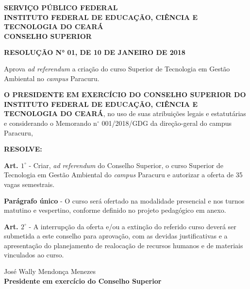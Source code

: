 
\begin{center}
\begin{figure}[!ht]
\centering
\end{figure}
\vspace*{-0.8cm}
\textbf{
SERVIÇO PÚBLICO FEDERAL \\
INSTITUTO FEDERAL DE EDUCAÇÃO, CIÊNCIA E TECNOLOGIA DO CEARÁ \\
CONSELHO SUPERIOR
}
\end{center}

\begin{center}
\textbf{RESOLUÇÃO N° 01, DE 10 DE JANEIRO DE 2018}
\end{center}

\vspace*{-1cm}

\begin{SingleSpace}
\begin{flushright}
\begin{minipage}[b]{8cm}
\begin{small}
Aprova \textit{ad referendum} a criação do curso Superior de Tecnologia em Gestão Ambiental no \textit{campus} Paracuru. 
\end{small}
\end{minipage}
\end{flushright}
\end{SingleSpace}

\textbf{O PRESIDENTE EM EXERCÍCIO DO CONSELHO SUPERIOR DO INSTITUTO FEDERAL DE EDUCAÇÃO, CIÊNCIA E TECNOLOGIA DO CEARÁ}, no uso de suas atribuições legais e estatutárias e considerando o Memorando n$^{\circ}$ 001/2018/GDG da direção-geral do campus Paracuru, 

\textbf{RESOLVE:}

\textbf{Art. $1^{\circ}$} - Criar, \textit{ad referendum} do Conselho Superior, o curso Superior de Tecnologia em Gestão Ambiental do \textit{campus} Paracuru e autorizar a oferta de 35 vagas semestrais.

\textbf{Parágrafo único} - O curso será ofertado na modalidade presencial e nos turnos matutino e vespertino, conforme definido no projeto pedagógico em anexo. 

\textbf{Art. $2^{\circ}$} - A interrupção da oferta e/ou a extinção do referido curso deverá ser submetida a este conselho para aprovação, com as devidas justificativas e a apresentação do planejamento de realocação de recursos humanos e de materiais vinculados ao curso.

\begin{center}
José Wally Mendonça Menezes \\
\textbf{Presidente em exercício do Conselho Superior}
\end{center}